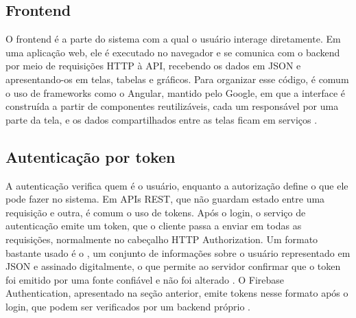 \subsection{Frontend}

O frontend é a parte do sistema com a qual o usuário interage diretamente. Em uma aplicação web, ele é executado no navegador e se comunica com o backend por meio de requisições HTTP à API, recebendo os dados em JSON e apresentando-os em telas, tabelas e gráficos. Para organizar esse código, é comum o uso de frameworks como o Angular, mantido pelo Google, em que a interface é construída a partir de componentes reutilizáveis, cada um responsável por uma parte da tela, e os dados compartilhados entre as telas ficam em serviços \cite{angular2026}.

\subsection{Autenticação por token}

A autenticação verifica quem é o usuário, enquanto a autorização define o que ele pode fazer no sistema. Em APIs REST, que não guardam estado entre uma requisição e outra, é comum o uso de tokens. Após o login, o serviço de autenticação emite um token, que o cliente passa a enviar em todas as requisições, normalmente no cabeçalho HTTP Authorization. Um formato bastante usado é o , um conjunto de informações sobre o usuário representado em JSON e assinado digitalmente, o que permite ao servidor confirmar que o token foi emitido por uma fonte confiável e não foi alterado \cite{rfc7519}. O Firebase Authentication, apresentado na seção anterior, emite tokens nesse formato após o login, que podem ser verificados por um backend próprio \cite{firebaseauth2026}.